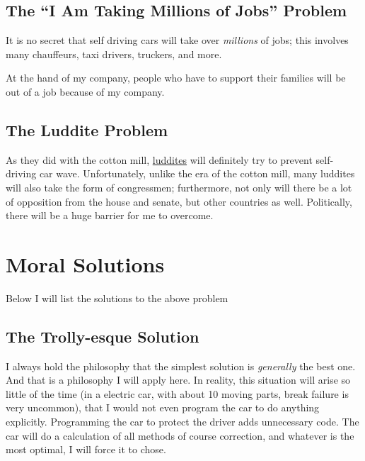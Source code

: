\documentclass[12pt]{article}
\begin{document}
\subsection{\texorpdfstring{The ``I Am Taking Millions of Jobs'' Problem}{The I Am Taking Millions of Jobs Problem}}\label{the-i-am-taking-millions-of-jobs-problem}

It is no secret that self driving cars will take over \emph{millions} of jobs; this involves many chauffeurs, taxi drivers, truckers, and more.

At the hand of my company, people who have to support their families will be out of a job because of my company.

\subsection{The Luddite Problem}\label{the-luddite-problem}

As they did with the cotton mill, \href{https://en.wikipedia.org/wiki/Luddite}{luddites} will definitely try to prevent self-driving car wave. Unfortunately, unlike the era of the cotton mill, many luddites will also take the form of congressmen; furthermore, not only will there be a lot of opposition from the house and senate, but other countries as well. Politically, there will be a huge barrier for me to overcome.

\section{Moral Solutions}\label{component-2-moral-solutions}

Below I will list the solutions to the above problem

\subsection{The Trolly-esque Solution}\label{the-trolly-esque-solution}

I always hold the philosophy that the simplest solution is \emph{generally} the best one. And that is a philosophy I will apply here. In reality, this situation will arise so little of the time (in a electric car, with about 10 moving parts, break failure is very uncommon), that I would not even program the car to do anything explicitly. Programming the car to protect the driver adds unnecessary code. The car will do a calculation of all methods of course correction, and whatever is the most optimal, I will force it to chose.
\end{document}
